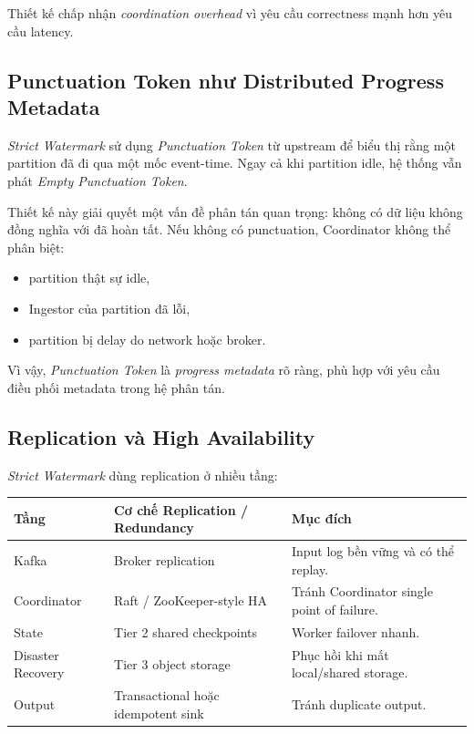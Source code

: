 \documentclass[12pt,a4paper]{article}
\begin{document}
Thiết kế chấp nhận \textit{coordination overhead} vì yêu cầu correctness mạnh hơn yêu cầu latency.

\subsection{Punctuation Token như Distributed Progress Metadata}

\textit{Strict Watermark} sử dụng \textit{Punctuation Token} từ upstream để biểu thị rằng một partition đã đi qua một mốc event-time. Ngay cả khi partition idle, hệ thống vẫn phát \textit{Empty Punctuation Token}.

Thiết kế này giải quyết một vấn đề phân tán quan trọng: không có dữ liệu không đồng nghĩa với đã hoàn tất. Nếu không có punctuation, Coordinator không thể phân biệt:

\begin{itemize}
    \item partition thật sự idle,
    \item Ingestor của partition đã lỗi,
    \item partition bị delay do network hoặc broker.
\end{itemize}

Vì vậy, \textit{Punctuation Token} là \textit{progress metadata} rõ ràng, phù hợp với yêu cầu điều phối metadata trong hệ phân tán.

\subsection{Replication và High Availability}

\textit{Strict Watermark} dùng replication ở nhiều tầng:

\begin{longtable}{p{} p{} p{}}
\toprule
\textbf{Tầng} & \textbf{Cơ chế Replication / Redundancy} & \textbf{Mục đích} \\
\midrule
\endhead
Kafka & Broker replication & Input log bền vững và có thể replay. \\
Coordinator & Raft / ZooKeeper-style HA & Tránh Coordinator single point of failure. \\
State & Tier 2 shared checkpoints & Worker failover nhanh. \\
Disaster Recovery & Tier 3 object storage & Phục hồi khi mất local/shared storage. \\
Output & Transactional hoặc idempotent sink & Tránh duplicate output. \\
\bottomrule
\end{longtable}
\end{document}
